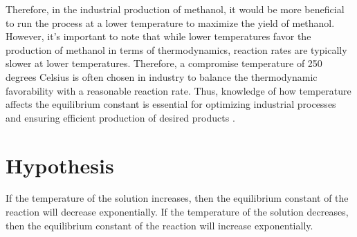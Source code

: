 Therefore, in the industrial production of methanol, it would be more beneficial to run the process at a lower temperature to maximize the yield of methanol. However, it's important to note that while lower temperatures favor the production of methanol in terms of thermodynamics, reaction rates are typically slower at lower temperatures. Therefore, a compromise temperature of 250 degrees Celsius is often chosen in industry to balance the thermodynamic favorability with a reasonable reaction rate. Thus, knowledge of how temperature affects the equilibrium constant is essential for optimizing industrial processes and ensuring efficient production of desired products \citep{sciencedirectProductionMethanol}.



\section{Hypothesis}
If the temperature of the solution increases, then the equilibrium constant of the reaction will decrease exponentially. If the temperature of the solution decreases, then the equilibrium constant of the reaction will increase exponentially. 